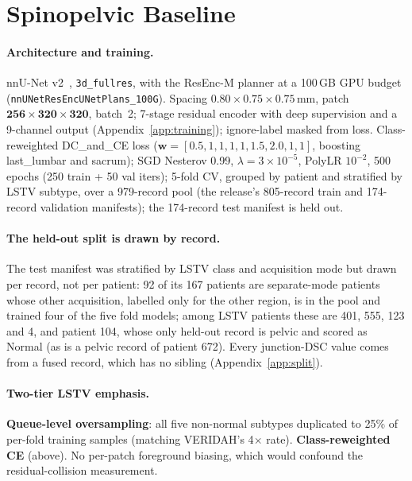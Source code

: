 \documentclass{article}
\newcommand{\VERIDAH}{VERIDAH}
\begin{document}
\section{Spinopelvic Baseline}
\label{sec:baseline}

\paragraph{Architecture and training.}
nnU-Net v2~\citep{Isensee2020NnU-Net:Segmentation,Isensee2024Nnu-netSegmentation},
\texttt{3d\_fullres}, with the ResEnc-M planner at a
100\,GB GPU budget (\texttt{nnUNetResEncUNetPlans\_100G}).
Spacing $0.80{\times}0.75{\times}0.75$\,mm, patch
$\mathbf{256{\times}320{\times}320}$, batch~2; 7-stage
residual encoder with deep supervision and a 9-channel
output (Appendix~\ref{app:training}); ignore-label masked
from loss. Class-reweighted DC\_and\_CE loss
($\mathbf{w}{=}[0.5,1,1,1,1,\mathbf{1.5},\mathbf{2.0},1,1]$,
boosting last\_lumbar and sacrum); SGD
Nesterov 0.99, $\lambda{=}3{\times}10^{-5}$, PolyLR
$10^{-2}$, 500 epochs (250 train + 50 val iters); 5-fold
CV, grouped by patient and stratified by LSTV subtype,
over a 979-record pool (the release's 805-record train and
174-record validation manifests); the 174-record test
manifest is held out.

\paragraph{The held-out split is drawn by record.}
The test manifest was stratified by LSTV class and
acquisition mode but drawn per record, not per patient: 92
of its 167 patients are separate-mode patients whose other
acquisition, labelled only for the other region, is in the
pool and trained four of the five fold models; among LSTV
patients these are 401, 555, 123 and 4, and patient 104,
whose only held-out record is pelvic and scored as Normal
(as is a pelvic record of patient 672). Every junction-DSC
value comes from a fused record, which has no sibling
(Appendix~\ref{app:split}).

\paragraph{Two-tier LSTV emphasis.}
\textbf{Queue-level oversampling}: all five non-normal
subtypes duplicated to 25\% of per-fold training samples
(matching \VERIDAH{}'s 4$\times$ rate).
\textbf{Class-reweighted CE} (above). No per-patch
foreground biasing, which would confound the
residual-collision measurement.
\end{document}
